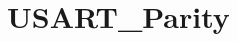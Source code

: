 \hypertarget{group___u_s_a_r_t___parity}{\section{U\-S\-A\-R\-T\-\_\-\-Parity}
\label{group___u_s_a_r_t___parity}
}
